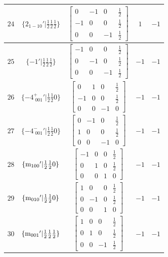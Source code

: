 \documentclass[fleqn,8pt]{jsarticle}
\begin{document}
\begin{longtable}{ccccc}
$ 24 $ & $ \{2{}_{1-10}{}'|\frac{1}{2} \frac{1}{2} \frac{1}{2}\} $ & $ \begin{bmatrix} 0 & -1 & 0 & \frac{1}{2} \\ -1 & 0 & 0 & \frac{1}{2} \\ 0 & 0 & -1 & \frac{1}{2} \end{bmatrix} $ & $ 1 $ & $ -1 $ \\ \hline
$ 25 $ & $ \{-1{}'|\frac{1}{2} \frac{1}{2} \frac{1}{2}\} $ & $ \begin{bmatrix} -1 & 0 & 0 & \frac{1}{2} \\ 0 & -1 & 0 & \frac{1}{2} \\ 0 & 0 & -1 & \frac{1}{2} \end{bmatrix} $ & $ -1 $ & $ -1 $ \\ \hline
$ 26 $ & $ \{-4^{+}_{\,\,001}{}'|\frac{1}{2} \frac{1}{2} 0\} $ & $ \begin{bmatrix} 0 & 1 & 0 & \frac{1}{2} \\ -1 & 0 & 0 & \frac{1}{2} \\ 0 & 0 & -1 & 0 \end{bmatrix} $ & $ -1 $ & $ -1 $ \\ \hline
$ 27 $ & $ \{-4^{-}_{\,\,001}{}'|\frac{1}{2} \frac{1}{2} 0\} $ & $ \begin{bmatrix} 0 & -1 & 0 & \frac{1}{2} \\ 1 & 0 & 0 & \frac{1}{2} \\ 0 & 0 & -1 & 0 \end{bmatrix} $ & $ -1 $ & $ -1 $ \\ \hline
$ 28 $ & $ \{{\rm m}_{100}{}'|\frac{1}{2} \frac{1}{2} 0\} $ & $ \begin{bmatrix} -1 & 0 & 0 & \frac{1}{2} \\ 0 & 1 & 0 & \frac{1}{2} \\ 0 & 0 & 1 & 0 \end{bmatrix} $ & $ -1 $ & $ -1 $ \\ \hline
$ 29 $ & $ \{{\rm m}_{010}{}'|\frac{1}{2} \frac{1}{2} 0\} $ & $ \begin{bmatrix} 1 & 0 & 0 & \frac{1}{2} \\ 0 & -1 & 0 & \frac{1}{2} \\ 0 & 0 & 1 & 0 \end{bmatrix} $ & $ -1 $ & $ -1 $ \\ \hline
$ 30 $ & $ \{{\rm m}_{001}{}'|\frac{1}{2} \frac{1}{2} \frac{1}{2}\} $ & $ \begin{bmatrix} 1 & 0 & 0 & \frac{1}{2} \\ 0 & 1 & 0 & \frac{1}{2} \\ 0 & 0 & -1 & \frac{1}{2} \end{bmatrix} $ & $ -1 $ & $ -1 $ \\ \hline

\end{longtable}
\end{document}
